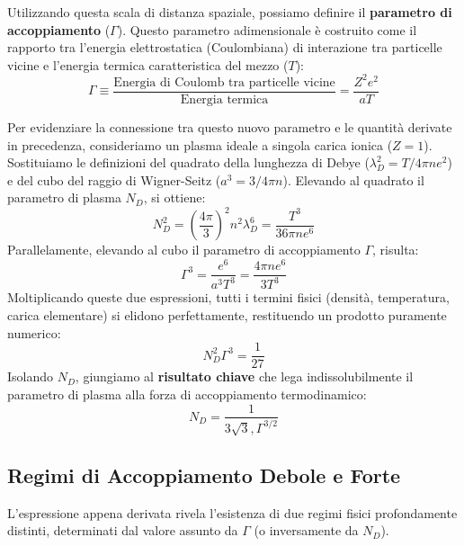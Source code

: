 Utilizzando questa scala di distanza spaziale, possiamo definire il \textbf{parametro di accoppiamento} ($\Gamma$). Questo parametro adimensionale è costruito come il rapporto tra l'energia elettrostatica (Coulombiana) di interazione tra particelle vicine e l'energia termica caratteristica del mezzo ($T$):
\begin{equation}
\Gamma \equiv \frac{\text{Energia di Coulomb tra particelle vicine}}{\text{Energia termica}} = \frac{Z^2 e^2}{a T}
\end{equation}

Per evidenziare la connessione tra questo nuovo parametro e le quantità derivate in precedenza, consideriamo un plasma ideale a singola carica ionica ($Z=1$). Sostituiamo le definizioni del quadrato della lunghezza di Debye ($\lambda_D^2 = T / 4\pi n e^2$) e del cubo del raggio di Wigner-Seitz ($a^3 = 3 / 4\pi n$).
Elevando al quadrato il parametro di plasma $N_D$, si ottiene:
\begin{equation}
N_D^2 = \left( \frac{4\pi}{3} \right)^2 n^2 \lambda_D^6 = \frac{T^3}{36\pi n e^6}
\end{equation}
Parallelamente, elevando al cubo il parametro di accoppiamento $\Gamma$, risulta:
\begin{equation}
\Gamma^3 = \frac{e^6}{a^3 T^3} = \frac{4\pi n e^6}{3 T^3}
\end{equation}
Moltiplicando queste due espressioni, tutti i termini fisici (densità, temperatura, carica elementare) si elidono perfettamente, restituendo un prodotto puramente numerico:
\begin{equation}
N_D^2 \Gamma^3 = \frac{1}{27}
\end{equation}
Isolando $N_D$, giungiamo al \textbf{risultato chiave} che lega indissolubilmente il parametro di plasma alla forza di accoppiamento termodinamico:
\begin{equation}
N_D = \frac{1}{3\sqrt{3} , \Gamma^{3/2}}
\end{equation}

\subsection{Regimi di Accoppiamento Debole e Forte}
L'espressione appena derivata rivela l'esistenza di due regimi fisici profondamente distinti, determinati dal valore assunto da $\Gamma$ (o inversamente da $N_D$).

